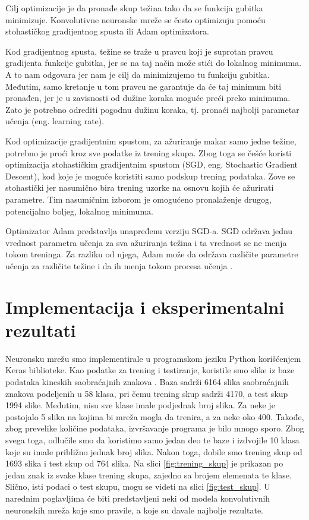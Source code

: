 \documentclass[a4paper]{article}
\begin{document}
Cilj optimizacije je da pronađe skup težina tako da se funkcija gubitka minimizuje. Konvolutivne neuronske mreže se često optimizuju pomoću stohastičkog gradijentnog spusta ili 
Adam optimizatora.

Kod gradijentnog spusta, težine se traže u pravcu koji je suprotan pravcu gradijenta funkcije gubitka, jer se na taj način može stići do lokalnog minimuma. A to nam odgovara jer nam je cilj da minimizujemo tu funkciju gubitka. Međutim, samo kretanje u tom pravcu ne garantuje da će taj minimum biti pronađen, jer je u zavisnosti od dužine koraka moguće preći preko minimuma. Zato je potrebno odrediti pogodnu dužinu koraka, tj. pronaći najbolji parametar učenja (eng. learning rate). 

Kod optimizacije gradijentnim spustom, za ažuriranje makar samo jedne težine, potrebno je proći kroz sve podatke iz trening skupa. Zbog toga se češće koristi optimizacija stohastičkim gradijentnim spustom (SGD, eng. Stochastic Gradient Descent), kod koje je moguće koristiti samo podskup trening podataka. Zove se stohastički jer nasumično bira trening uzorke na osnovu kojih će ažurirati parametre. Tim nasumičnim izborom je omogućeno pronalaženje drugog, potencijalno boljeg, lokalnog minimuma.

Optimizator Adam predstavlja unapređenu verziju SGD-a. SGD održava jednu vrednost parametra učenja za sva ažuriranja težina i ta vrednost se ne menja tokom treninga. Za razliku od njega, Adam može da održava različite parametre učenja za različite težine i da ih menja tokom procesa učenja \cite{Adam}.

\section{Implementacija i eksperimentalni rezultati}
\label{sec:implementacija_i_eksperimentalni_rezultati}


Neuronsku mrežu smo implementirale u programskom jeziku Python korišćenjem Keras biblioteke. Kao podatke za trening i testiranje, koristile smo slike iz baze podataka kineskih saobraćajnih znakova \cite{CTSD}. Baza sadrži 6164 slika saobraćajnih znakova podeljenih u 58 klasa, pri čemu trening skup sadrži 4170, a test skup 1994 slike. Međutim, nisu sve klase imale podjednak broj slika. Za neke je postojalo 5 slika na kojima bi mreža mogla da trenira, a za neke oko 400. Takođe, zbog prevelike količine podataka, izvršavanje programa je bilo mnogo sporo. Zbog svega toga, odlučile smo da koristimo samo jedan deo te baze i izdvojile 10 klasa koje su imale približno jednak broj slika. Nakon toga, dobile smo trening skup od 1693 slika i test skup od 764 slika. Na slici \ref{fig:trening_skup} je prikazan po jedan znak iz svake klase trening skupa, zajedno sa brojem elemenata te klase. Slično, isti podaci o test skupu, mogu se videti na slici \ref{fig:test_skup}. U narednim poglavljima će biti predstavljeni neki od modela konvolutivnih neuronskih mreža koje smo pravile, a koje su davale najbolje rezultate.
\end{document}
